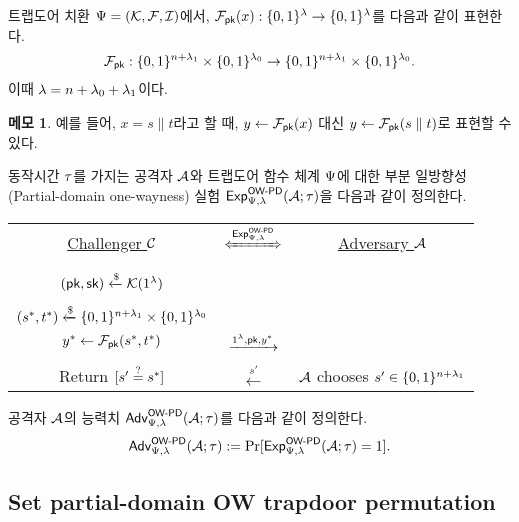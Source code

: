 \documentclass{article}
\theoremstyle{definition}
\newtheorem{memo}{메모}
\begin{document}
트랩도어 치환 $\Psi = (\mathcal{K}, \mathcal{F}, \mathcal{I})$에서, $\mathcal{F}_{\textsf{pk}}(x):\{0, 1\}^{\lambda} \to
\{0, 1\}^{\lambda}$를 다음과 같이 표현한다.
$$
	\mathcal{F}_{\textsf{pk}}: \{0, 1\}^{n + \lambda_1} \times \{0, 1\}^{\lambda_0} \to \{0, 1\}^{n + \lambda_1} \times \{0, 1\}^{\lambda_0}.
$$
이때 $\lambda = n + \lambda_0 + \lambda_1$이다. 
\begin{memo}
	예를 들어, $x = s \parallel t$라고 할 때, $y \gets \mathcal{F}_{\textsf{pk}}(x)$ 대신 $y
	\gets \mathcal{F}_{\textsf{pk}}(s \parallel t)$로 표현할 수 있다.
\end{memo}
동작시간 $\tau$를 가지는 공격자 $\mathcal{A}$와 트랩도어 함수 체계 $\Psi$에 대한 부분
일방향성(Partial-domain one-wayness) 실험 $\textsf{Exp}^{\textsf{OW-PD}}_{\Psi, \lambda}(\mathcal{A};
\tau)$을 다음과 같이 정의한다.

\begin{tcolorbox}[colback=white]
	\centering
	\begin{tabularx}{\linewidth}{CcC}
		\underline{Challenger $\mathcal{C}$} & $\xLeftrightarrow{\Exp^{\owpd}_{\tdsch, \sp}}$ & \underline{Adversary $\mathcal{A}$} \\
		\\
		$(\textsf{pk}, \textsf{sk}) \xleftarrow{\$} \mathcal{K}(1^{\lambda})$ & & \\
		\\
		$(s^*, t^*) \xleftarrow{\$} \{0, 1\}^{n + \lambda_1} \times \{0, 1\}^{\lambda_0}$ \\ $y^* \gets \mathcal{F}_{\textsf{pk}}(s^*, t^*)$ & $\xrightarrow{1^{\lambda}, \textsf{pk}, y^*}$ & \\
		\\
		Return $[s' \overset{?}{=} s^*]$ & $\xleftarrow{s'}$ & $\mathcal{A}$ chooses $s' \in \{0, 1\}^{n + \lambda_1}$ \\
  \end{tabularx}
\end{tcolorbox}

공격자 $\mathcal{A}$의 능력치 $\textsf{Adv}^{\textsf{OW-PD}}_{\Psi, \lambda}(\mathcal{A}; \tau)$를 다음과 같이 정의한다.
$$
	\textsf{Adv}^{\textsf{OW-PD}}_{\Psi, \lambda}(\mathcal{A}; \tau) := \Pr[\textsf{Exp}^{\textsf{OW-PD}}_{\Psi, \lambda}(\mathcal{A}; \tau) = 1].
$$

\subsection{Set partial-domain OW trapdoor permutation}
\end{document}
